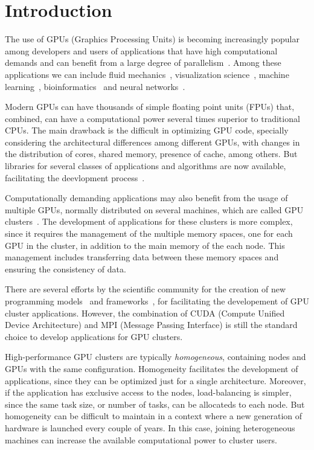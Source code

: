 \documentclass[journal]{IEEEtran}
\begin{document}
\section{Introduction}


The use of GPUs (Graphics Processing Units) is becoming increasingly popular
among developers and users of applications that have high computational demands
and can benefit from a large degree of parallelism~\cite{gpu2}. Among these
applications we can include fluid mechanics~\cite{fluid2}, visualization
science~\cite{visualization2}, machine learning~\cite{learning2},
bioinformatics~\cite{bioinformatica2} and neural networks~\cite{neural}.

Modern GPUs can have thousands of simple floating point units (FPUs) that,
combined, can have a computational power several times superior to traditional
CPUs. The main drawback is the difficult in optimizing GPU code, specially
considering the architectural differences among different GPUs, with changes in
the distribution of cores, shared memory, presence of cache, among others. But
libraries for several classes of applications and algorithms are now available,
facilitating the deevlopment process~\cite{}.

Computationally demanding applications may also benefit from the usage of
multiple GPUs, normally distributed on several machines, which are called GPU
clusters~\cite{raphael, cluster}. The development of applications for these
clusters is more complex, since it requires the management of the multiple
memory spaces, one for each GPU in the cluster, in addition to the main memory
of the each node. This management includes transferring data between these
memory spaces and ensuring the consistency of data. 

There are several efforts by the scientific community for the creation of new
programming models~\cite{appCientificas, wave} and frameworks~\cite{snucl, Flat,
  starpu}, for facilitating the developement of GPU cluster
applications. However, the combination of CUDA (Compute Unified Device
Architecture) and MPI (Message Passing Interface) is still the standard choice
to develop applications for GPU clusters.

High-performance GPU clusters are typically \emph{homogeneous}, containing nodes
and GPUs with the same configuration. Homogeneity facilitates the development of
applications, since they can be optimized just for a single
architecture. Moreover, if the application has exclusive access to the nodes,
load-balancing is simpler, since the same task size, or number of tasks, can be
allocateds to each node. But homogeneity can be difficult to maintain in a
context where a new generation of hardware is launched every couple of years. In
this case, joining heterogeneous machines can increase the available
computational power to cluster users.
\end{document}
